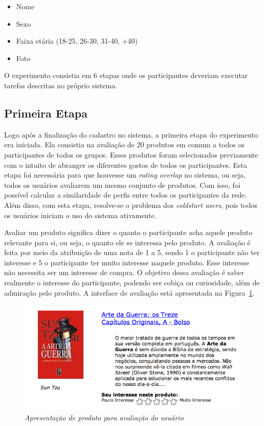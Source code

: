 \begin{itemize}
  \item Nome
  \item Sexo
  \item Faixa etária (18-25, 26-30, 31-40, +40)
  \item Foto
\end{itemize}

O experimento consistia em 6 etapas onde os participantes deveriam executar tarefas descritas no próprio sistema.

\subsection{Primeira Etapa}
\label{cha:primeira_etapa}

Logo após a finalização do cadastro no sistema, a primeira etapa do experimento era iniciada. Ela consistia na avaliação de 20 produtos em comum a todos os participantes de todos os grupos. Esses produtos foram selecionados previamente com o intuito de abranger os diferentes gostos de todos os participantes. Esta etapa foi necessária para que houvesse um \textit{rating overlap} no sistema, ou seja, todos os usuários avaliarem um mesmo conjunto de produtos. Com isso, foi possível calcular a similaridade de perfis entre todos os participantes da rede. Além disso, com esta etapa, resolve-se o problema dos \textit{coldstart users}, pois todos os usuários iniciam o uso do sistema ativamente.

Avaliar um produto significa dizer o quanto o participante acha aquele produto relevante para si, ou seja, o quanto ele se interessa pelo produto. A avaliação é feita por meio da atribuição de uma nota de 1 a 5, sendo 1 o participante não ter interesse e 5 o participante ter muito interesse naquele produto. Esse interesse não necessita ser um interesse de compra. O objetivo dessa avaliação é saber realmente o interesse do participante, podendo ser cobiça ou curiosidade, além de admiração pelo produto. A interface de avaliação está apresentada na Figura~\ref{fig:product-rating}.

\begin{figure}
  \centering
  \includegraphics[width=\textwidth]{imagens/product-rating}
  \caption{\it Apresentação de produto para avaliação do usuário}
  \label{fig:product-rating}
\end{figure}

